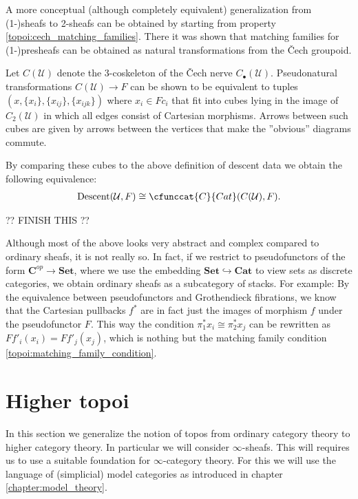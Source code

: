     A more conceptual (although completely equivalent) generalization from (1-)sheafs to 2-sheafs can be obtained by starting from property \ref{topoi:cech_matching_families}. There it was shown that matching families for (1-)presheafs can be obtained as natural transformations from the \v{C}ech groupoid.
    \begin{property}
        Let $C(\mathcal{U})$ denote the 3-coskeleton of the \v{C}ech nerve $C_\bullet(\mathcal{U})$. Pseudonatural transformations $C(\mathcal{U})\rightarrow F$ can be shown to be equivalent to tuples $(x, \{x_i\}, \{x_{ij}\}, \{x_{ijk}\})$ where $x_i\in Fc_i$ that fit into cubes lying in the image of $C_2(\mathcal{U})$ in which all edges consist of Cartesian morphisms. Arrows between such cubes are given by arrows between the vertices that make the ''obvious'' diagrams commute.

        By comparing these cubes to the above definition of descent data we obtain the following equivalence:
        \begin{gather}
            \text{Descent}(\mathcal{U}, F)\cong\cfunccat{C}{Cat}(C(\mathcal{U}), F).
        \end{gather}

        ?? FINISH THIS ??
    \end{property}

    \begin{remark}[1-sheafs]
        Although most of the above looks very abstract and complex compared to ordinary sheafs, it is not really so. In fact, if we restrict to pseudofunctors of the form $\mathbf{C}^{op}\rightarrow\mathbf{Set}$, where we use the embedding $\mathbf{Set}\hookrightarrow\mathbf{Cat}$ to view sets as discrete categories, we obtain ordinary sheafs as a subcategory of stacks. For example: By the equivalence between pseudofunctors and Grothendieck fibrations, we know that the Cartesian pullbacks $f^*$ are in fact just the images of morphism $f$ under the pseudofunctor $F$. This way the condition $\pi_1^*x_i\cong\pi^*_2x_j$ can be rewritten as $Ff'_i(x_i)=Ff'_j(x_j)$, which is nothing but the matching family condition \ref{topoi:matching_family_condition}.
    \end{remark}

\section{Higher topoi}

    In this section we generalize the notion of topos from ordinary category theory to higher category theory. In particular we will consider $\infty$-sheafs. This will requires us to use a suitable foundation for $\infty$-category theory. For this we will use the language of (simplicial) model categories as introduced in chapter \ref{chapter:model_theory}.

